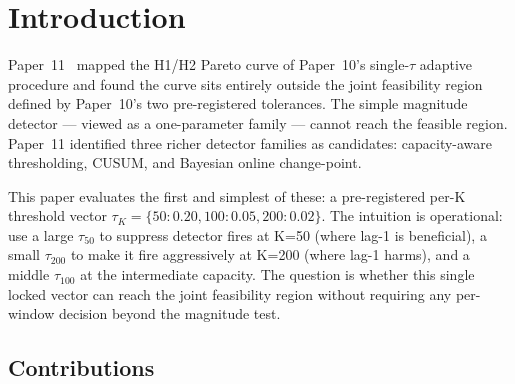 \section{Introduction}

Paper~11~\cite{paper11tau} mapped the H1/H2 Pareto curve of Paper~10's
single-$\tau$ adaptive procedure and found the curve sits entirely
outside the joint feasibility region defined by Paper~10's two
pre-registered tolerances. The simple magnitude detector --- viewed
as a one-parameter family --- cannot reach the feasible region.
Paper~11 identified three richer detector families as candidates:
capacity-aware thresholding, CUSUM, and Bayesian online change-point.

This paper evaluates the first and simplest of these: a pre-registered
per-K threshold vector $\tau_K = \{50: 0.20, 100: 0.05, 200: 0.02\}$.
The intuition is operational: use a large $\tau_{50}$ to suppress
detector fires at K=50 (where lag-1 is beneficial), a small
$\tau_{200}$ to make it fire aggressively at K=200 (where lag-1
harms), and a middle $\tau_{100}$ at the intermediate capacity. The
question is whether this single locked vector can reach the joint
feasibility region without requiring any per-window decision beyond
the magnitude test.

\subsection{Contributions}

